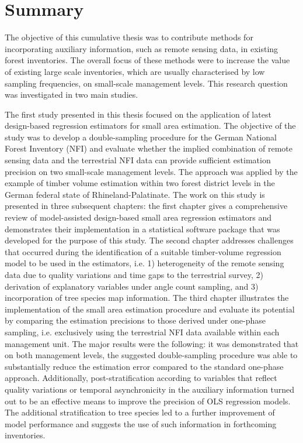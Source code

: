\chapter*{Summary}
\label{chap:Summary}

The objective of this cumulative thesis was to contribute methods for incorporating auxiliary information, such as remote sensing data, in existing forest inventories. The overall focus of these methods were to increase the value of existing large scale inventories, which are usually characterised by low sampling frequencies, on small-scale management levels. This research question was investigated in two main studies.\par

The first study presented in this thesis focused on the application of latest design-based regression estimators for small area estimation. The objective of the study was to develop a double-sampling procedure for the German National Forest Inventory (NFI) and evaluate whether the implied combination of remote sensing data and the terrestrial NFI data can provide sufficient estimation precision on two small-scale management levels. The approach was applied by the example of timber volume estimation within two forest district levels in the German federal state of Rhineland-Palatinate. The work on this study is presented in three subsequent chapters: the first chapter gives a comprehensive review of model-assisted design-based small area regression estimators and demonstrates their implementation in a statistical software package that was developed for the purpose of this study. The second chapter addresses challenges that occurred during the identification of a suitable timber-volume regression model to be used in the estimators, i.e. 1) heterogeneity of the remote sensing data due to quality variations and time gaps to the terrestrial survey, 2) derivation of explanatory variables under angle count sampling, and 3) incorporation of tree species map information. The third chapter illustrates the implementation of the small area estimation procedure and evaluate its potential by comparing the estimation precisions to those derived under one-phase sampling, i.e. exclusively using the terrestrial NFI data available within each management unit. The major results were the following: it was demonstrated that on both management levels, the suggested double-sampling procedure was able to substantially reduce the estimation error compared to the standard one-phase approach. Additionally, post-stratification according to variables that reflect quality variations or temporal asynchronicity in the auxiliary information turned out to be an effective means to improve the precision of OLS regression models. The additional stratification to tree species led to a further improvement of model performance and suggests the use of such information in forthcoming inventories.\par

